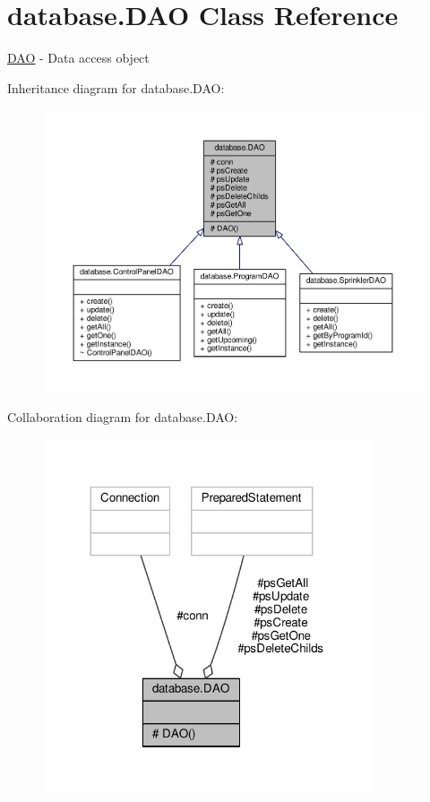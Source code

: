 \hypertarget{classdatabase_1_1DAO}{\section{database.\-D\-A\-O Class Reference}
\label{classdatabase_1_1DAO}
}


\hyperlink{classdatabase_1_1DAO}{D\-A\-O} -\/ Data access object  




Inheritance diagram for database.\-D\-A\-O\-:\nopagebreak
\begin{figure}[H]
\begin{center}
\leavevmode
\includegraphics[width=350pt]{classdatabase_1_1DAO__inherit__graph}
\end{center}
\end{figure}


Collaboration diagram for database.\-D\-A\-O\-:\nopagebreak
\begin{figure}[H]
\begin{center}
\leavevmode
\includegraphics[width=276pt]{classdatabase_1_1DAO__coll__graph}
\end{center}
\end{figure}
